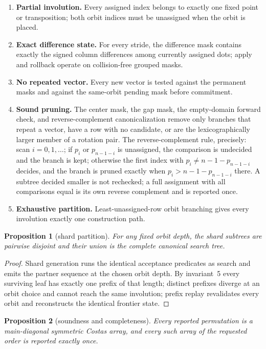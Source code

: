 \documentclass[11pt]{article}
\newtheorem{proposition}{Proposition}
\begin{document}
\begin{enumerate}
\item \textbf{Partial involution.} Every assigned index belongs to exactly
one fixed point or transposition; both orbit indices must be unassigned
when the orbit is placed.
\item \textbf{Exact difference state.} For every stride, the difference
mask contains exactly the signed column differences among currently
assigned dots; apply and rollback operate on collision-free grouped masks.
\item \textbf{No repeated vector.} Every new vector is tested against the
permanent masks and against the same-orbit pending mask before
commitment.
\item \textbf{Sound pruning.} The center mask, the gap mask, the
empty-domain forward check, and reverse-complement canonicalization remove
only branches that repeat a vector, have a row with no candidate, or are
the lexicographically larger member of a rotation pair.  The
reverse-complement rule, precisely: scan $i=0,1,\ldots$; if $p_{i}$ or
$p_{n-1-i}$ is unassigned, the comparison is undecided and the branch is
kept; otherwise the first index with $p_{i}\neq n-1-p_{n-1-i}$ decides,
and the branch is pruned exactly when $p_{i}> n-1-p_{n-1-i}$ there.  A
subtree decided smaller is not rechecked; a full assignment with all
comparisons equal is its own reverse complement and is reported once.
\item \textbf{Exhaustive partition.} Least-unassigned-row orbit branching
gives every involution exactly one construction path.
\end{enumerate}

\begin{proposition}[shard partition]
\label{prop:shards}
For any fixed orbit depth, the shard subtrees are pairwise disjoint and
their union is the complete canonical search tree.
\end{proposition}

\begin{proof}
Shard generation runs the identical acceptance predicates as search and
emits the partner sequence at the chosen orbit depth.  By invariant~5 every
surviving leaf has exactly one prefix of that length; distinct prefixes diverge
at an orbit choice and cannot reach the same involution; prefix replay
revalidates every orbit and reconstructs the identical frontier state.
\end{proof}

\begin{proposition}[soundness and completeness]
Every reported permutation is a main-diagonal symmetric Costas array, and
every such array of the requested order is reported exactly once.
\end{proposition}
\end{document}
